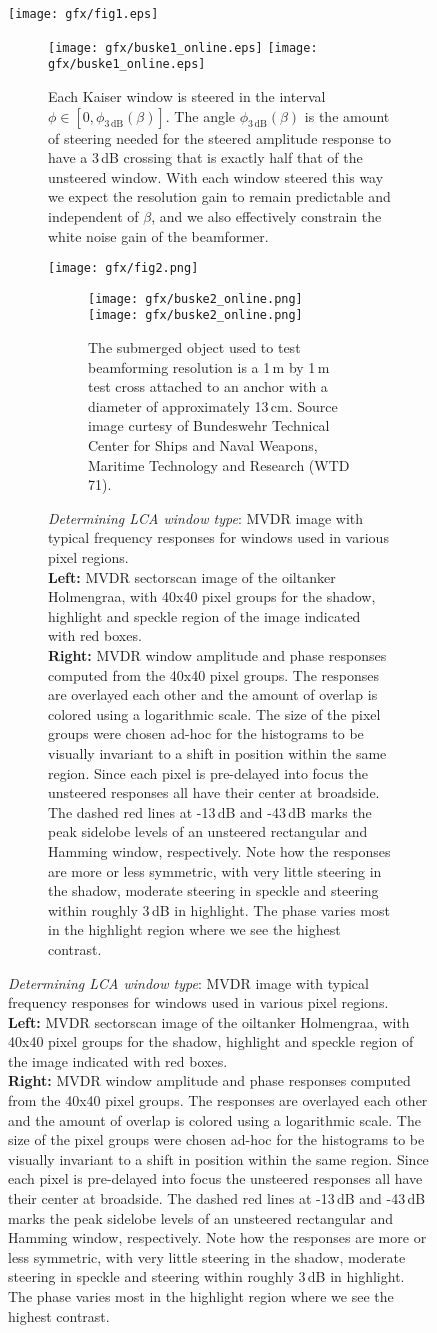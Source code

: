 \ifPhdDoc
   \begin{figure}[tbp]\centering%
   \texttt{[image: gfx/fig1.eps]}%
\else
   \begin{figure}[tbp]\centering%
   \ifPeerReview%
      \texttt{[image: gfx/buske1\_online.eps]}%
   \else%
      \texttt{[image: gfx/buske1\_online.eps]}%
\fi\fi%
\caption{Each Kaiser window is steered in the interval $\phi\in[0, \phi_{\mathrm{3\,dB}}(\beta)]$. The angle $\phi_{\mathrm{3\,dB}}(\beta)$ is the amount of steering needed for the steered amplitude response to have a \protect\minus{}3\,dB crossing that is exactly half that of the unsteered window. With each window steered this way we expect the resolution gain to remain predictable and independent of $\beta$, and we also effectively constrain the white noise gain of the beamformer.}\label{III_windows_steering}
\end{figure}

\ifPhdDoc
   \begin{figure}[tbp]\centering%
   \texttt{[image: gfx/fig2.png]}%
\else
   \begin{figure}[tbp]\centering%
   \ifPeerReview%
      \texttt{[image: gfx/buske2\_online.png]}%
   \else%
      \texttt{[image: gfx/buske2\_online.png]}%
\fi\fi%
\caption{The submerged object used to test beamforming resolution is a 1\,m by 1\,m test cross attached to an anchor with a diameter of approximately 13\,cm. Source image curtesy of Bundeswehr Technical Center for Ships and Naval Weapons, Maritime Technology and Research (WTD 71).}\label{III_cross}
\end{figure}


\ifPhdDoc
   \begin{figure*}[t]\centering%
   \caption{\emph{Determining LCA window type}: MVDR image with typical frequency responses for windows used in various pixel regions.\\[.5\baselineskip]
   \textbf{Left:} MVDR sectorscan image of the oiltanker Holmengraa, with 40x40 pixel groups for the shadow, highlight and speckle region of the image indicated with red boxes.\\[.5\baselineskip]
   \textbf{Right:} MVDR window amplitude and phase responses computed from the 40x40 pixel groups. The responses are overlayed each other and the amount of overlap is colored using a logarithmic scale. The size of the pixel groups were chosen ad-hoc for the histograms to be visually invariant to a shift in position within the same region. Since each pixel is pre-delayed into focus the unsteered responses all have their center at broadside. The dashed red lines at -13\,dB and -43\,dB marks the peak sidelobe levels of an unsteered rectangular and Hamming window, respectively. Note how the responses are more or less symmetric, with very little steering in the shadow, moderate steering in speckle and steering within roughly 3\,dB in highlight. The phase varies most in the highlight region where we see the highest contrast.}\label{III_mvdr_selected_windows}
\else
\setcounter{topnumber}{1}
\setcounter{dbltopnumber}{1}


\end{figure*}
\end{figure}
\end{figure}
